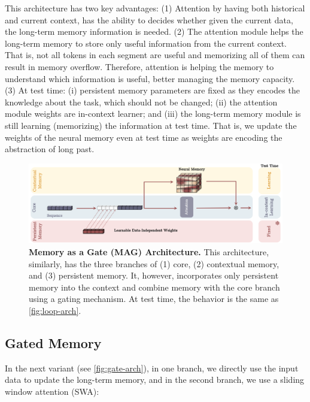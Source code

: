 This architecture has two key advantages: (1) Attention by having both historical and current context, has the ability to decides whether given the current data, the long-term memory information is needed. (2) The attention module helps the long-term memory to store only useful information from the current context. That is, not all tokens in each segment are useful and memorizing all of them can result in memory overflow. Therefore, attention is helping the memory to understand which information is useful, better managing the memory capacity. (3) At test time: (i) persistent memory parameters are fixed as they encodes the knowledge about the task, which should not be changed; (ii) the attention module weights are in-context learner; and (iii) the long-term memory module is still learning (memorizing) the information at test time. That is, we update the weights of the neural memory even at test time as weights are encoding the abstraction of long past.  
















\begin{figure}[t!]
    \centering
    \includegraphics[width=0.9\linewidth]{Figures/gate-arch.png}
    \caption{\textbf{Memory as a Gate (MAG) Architecture.} This architecture, similarly, has the three branches of (1) core, (2) contextual memory, and (3) persistent memory. It, however, incorporates only persistent memory into the context and combine memory with the core branch using a gating mechanism. At test time, the behavior is the same as \autoref{fig:loop-arch}.}
    \label{fig:gate-arch}
\end{figure}



\subsection{Gated Memory}
In the next variant (see \autoref{fig:gate-arch}), in one branch, we directly use the input data to update the long-term memory, and in the second branch, we use a sliding window attention (SWA):


